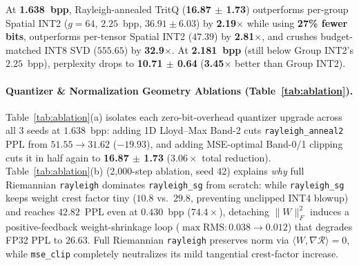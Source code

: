 \documentclass[11pt,a4paper]{article}
\begin{document}
At \textbf{1.638~bpp}, Rayleigh-annealed TritQ (\textbf{16.87 $\pm$ 1.73}) outperforms per-group Spatial INT2 ($g=64$, $2.25$~bpp, $36.91 \pm 6.03$) by \textbf{2.19$\times$} while using \textbf{27\% fewer bits}, outperforms per-tensor Spatial INT2 ($47.39$) by \textbf{2.81$\times$}, and crushes budget-matched INT8 SVD ($555.65$) by \textbf{32.9$\times$}. At \textbf{2.181~bpp} (still below Group INT2's $2.25$~bpp), perplexity drops to \textbf{10.71 $\pm$ 0.64} (\textbf{3.45$\times$} better than Group INT2).

\paragraph{Quantizer & Normalization Geometry Ablations (Table~\ref{tab:ablation}).}
Table~\ref{tab:ablation}(a) isolates each zero-bit-overhead quantizer upgrade across all 3 seeds at $1.638$~bpp: adding 1D Lloyd--Max Band-2 cuts \texttt{rayleigh\_anneal2} PPL from $51.55 \to 31.62$ ($-19.93$), and adding MSE-optimal Band-0/1 clipping cuts it in half again to \textbf{16.87 $\pm$ 1.73} ($3.06\times$ total reduction). Table~\ref{tab:ablation}(b) (2,000-step ablation, seed 42) explains \emph{why} full Riemannian \texttt{rayleigh} dominates \texttt{rayleigh\_sg} from scratch: while \texttt{rayleigh\_sg} keeps weight crest factor tiny ($10.8$ vs.\ $29.8$, preventing unclipped INT4 blowup) and reaches $42.82$~PPL even at $0.430$~bpp ($74.4\times$), detaching $\|W\|_F^2$ induces a positive-feedback weight-shrinkage loop ($\max\text{RMS}: 0.038 \to 0.012$) that degrades FP32 PPL to $26.63$. Full Riemannian \texttt{rayleigh} preserves norm via $\langle W, \nabla \mathcal{R}\rangle = 0$, while \texttt{mse\_clip} completely neutralizes its mild tangential crest-factor increase.
\end{document}

